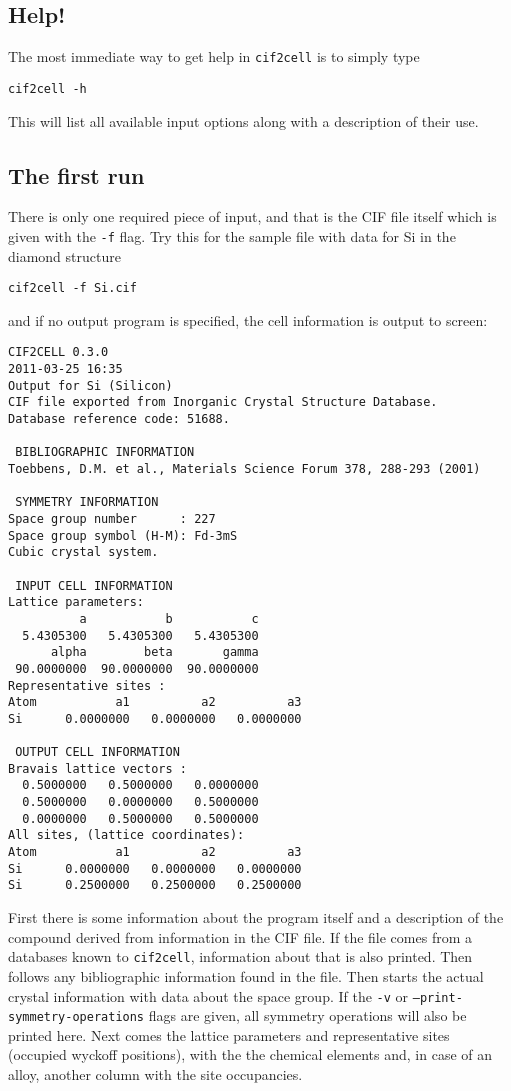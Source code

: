 \documentclass[11pt]{article}
\newcommand{\ciftocell}{\texttt{cif2cell}}
\begin{document}
\subsection{Help!}
The most immediate way to get help in \ciftocell{} is to simply type
\begin{verbatim}
cif2cell -h
\end{verbatim}
This will list all available input options along with a description of their use. 

\subsection{The first run}
There is only one required piece of input, and that is the CIF file itself which is given with the \texttt{-f} flag. Try this for the sample file with data for Si in the diamond structure
\begin{verbatim}
cif2cell -f Si.cif
\end{verbatim}
and if no output program is specified, the cell information is output to screen:

\newpage
\begin{verbatim}
CIF2CELL 0.3.0
2011-03-25 16:35
Output for Si (Silicon)
CIF file exported from Inorganic Crystal Structure Database.
Database reference code: 51688.

 BIBLIOGRAPHIC INFORMATION
Toebbens, D.M. et al., Materials Science Forum 378, 288-293 (2001) 

 SYMMETRY INFORMATION
Space group number      : 227
Space group symbol (H-M): Fd-3mS
Cubic crystal system.

 INPUT CELL INFORMATION
Lattice parameters:
          a           b           c 
  5.4305300   5.4305300   5.4305300 
      alpha        beta       gamma 
 90.0000000  90.0000000  90.0000000 
Representative sites :
Atom           a1          a2          a3 
Si      0.0000000   0.0000000   0.0000000

 OUTPUT CELL INFORMATION
Bravais lattice vectors :
  0.5000000   0.5000000   0.0000000 
  0.5000000   0.0000000   0.5000000 
  0.0000000   0.5000000   0.5000000 
All sites, (lattice coordinates):
Atom           a1          a2          a3 
Si      0.0000000   0.0000000   0.0000000
Si      0.2500000   0.2500000   0.2500000\end{verbatim}

\newpage
First there is some information about the program itself and a description of the compound derived from information in the CIF file. If the file comes from a databases known to \ciftocell, information about that is also printed. Then follows any bibliographic information found in the file. Then starts the actual crystal information with data about the space group. If the \texttt{-v} or \texttt{--print-symmetry-operations} flags are given, all symmetry operations will also be printed here. Next comes the lattice parameters and representative sites (occupied wyckoff positions), with the the chemical elements and, in case of an alloy, another column with the site occupancies.
\end{document}
